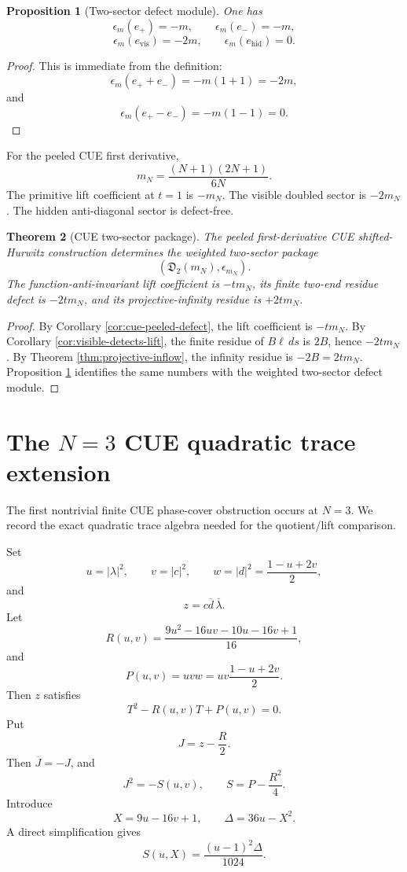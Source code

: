 \documentclass[11pt]{article}
\theoremstyle{plain}
\newtheorem{theorem}{Theorem}[section]
\newtheorem{proposition}[theorem]{Proposition}
\theoremstyle{definition}
\begin{document}
\begin{proposition}[Two-sector defect module]\label{prop:two-sector}
One has
\[
   \epsilon_m(e_+)=-m,
   \qquad
   \epsilon_m(e_-)=-m,
\]
\[
   \epsilon_m(e_{\operatorname{vis}})=-2m,
   \qquad
   \epsilon_m(e_{\operatorname{hid}})=0.
\]
\end{proposition}

\begin{proof}
This is immediate from the definition:
\[
   \epsilon_m(e_++e_-)=-m(1+1)=-2m,
\]
and
\[
   \epsilon_m(e_+-e_-)=-m(1-1)=0.
\]
\end{proof}

For the peeled CUE first derivative,
\[
   m_N=\frac{(N+1)(2N+1)}{6N}.
\]
The primitive lift coefficient at \(t=1\) is \(-m_N\).  The visible doubled sector is \(-2m_N\).  The hidden anti-diagonal sector is defect-free.

\begin{theorem}[CUE two-sector package]\label{thm:cue-two-sector}
The peeled first-derivative CUE shifted-Hurwitz construction determines the weighted two-sector package
\[
   (\mathfrak D_2(m_N),\epsilon_{m_N}).
\]
The function-anti-invariant lift coefficient is \(-tm_N\), its finite two-end residue defect is \(-2tm_N\), and its projective-infinity residue is \(+2tm_N\).
\end{theorem}

\begin{proof}
By Corollary \ref{cor:cue-peeled-defect}, the lift coefficient is \(-tm_N\).  By Corollary \ref{cor:visible-detects-lift}, the finite residue of \(B\ell\,ds\) is \(2B\), hence \(-2tm_N\).  By Theorem \ref{thm:projective-inflow}, the infinity residue is \(-2B=2tm_N\).  Proposition \ref{prop:two-sector} identifies the same numbers with the weighted two-sector defect module.
\end{proof}

\section{The \texorpdfstring{\(N=3\)}{N=3} CUE quadratic trace extension}

The first nontrivial finite CUE phase-cover obstruction occurs at \(N=3\).  We record the exact quadratic trace algebra needed for the quotient/lift comparison.

Set
\[
   u=|\lambda|^2,
   \qquad
   v=|c|^2,
   \qquad
   w=|d|^2=\frac{1-u+2v}{2},
\]
and
\[
   z=c\overline d\,\overline\lambda.
\]
Let
\[
   R(u,v)=\frac{9u^2-16uv-10u-16v+1}{16},
\]
and
\[
   P(u,v)=uvw=uv\frac{1-u+2v}{2}.
\]
Then \(z\) satisfies
\[
   T^2-R(u,v)T+P(u,v)=0.
\]
Put
\[
   J=z-\frac R2.
\]
Then \(\overline J=-J\), and
\[
   J^2=-S(u,v),
   \qquad
   S=P-\frac{R^2}{4}.
\]
Introduce
\[
   X=9u-16v+1,
   \qquad
   \Delta=36u-X^2.
\]
A direct simplification gives
\[
   S(u,X)=\frac{(u-1)^2\Delta}{1024}.
\]
\end{document}
